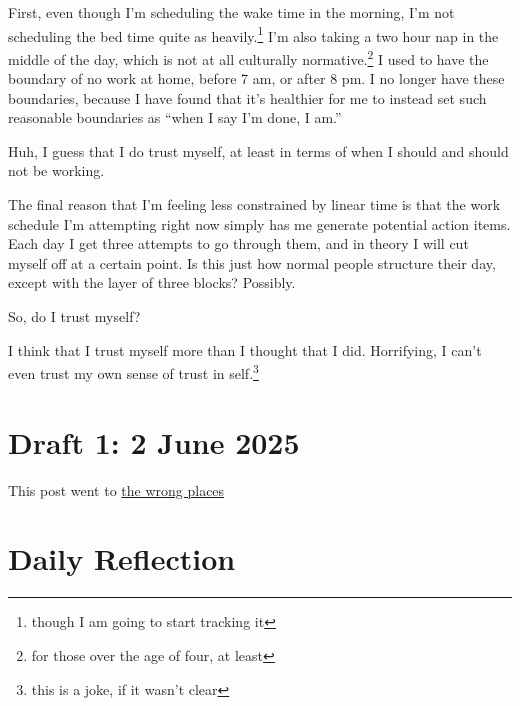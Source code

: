 \documentclass[12pt]{article}
\newcommand{\say}[1]{``#1''}
\renewcommand{\,}{\textsuperscript{,}}
\begin{document}
First, even though I'm scheduling the wake time in the morning, I'm not scheduling the bed time quite as heavily.\footnote{though I am going to start tracking it}  
I'm also taking a two hour nap in the middle of the day, which is not at all culturally normative.\footnote{for those over the age of four, at least}  
I used to have the boundary of no work at home, before 7 am, or after 8 pm.  
I no longer have these boundaries, because I have found that it's healthier for me to instead set such reasonable boundaries as \say{when I say I'm done, I am.}

Huh, I guess that I do trust myself, at least in terms of when I should and should not be working.

The final reason that I'm feeling less constrained by linear time is that the work schedule I'm attempting right now simply has me generate potential action items.  
Each day I get three attempts to go through them, and in theory I will cut myself off at a certain point.  
Is this just how normal people structure their day, except with the layer of three blocks? Possibly.

So, do I trust myself?

I think that I trust myself more than I thought that I did.  
Horrifying, I can't even trust my own sense of trust in self.\footnote{this is a joke, if it wasn't clear}

\section{Draft 1: 2 June 2025}

This post went to \href{what-we-dont-post}{the wrong places}

\section{Daily Reflection}
\end{document}
